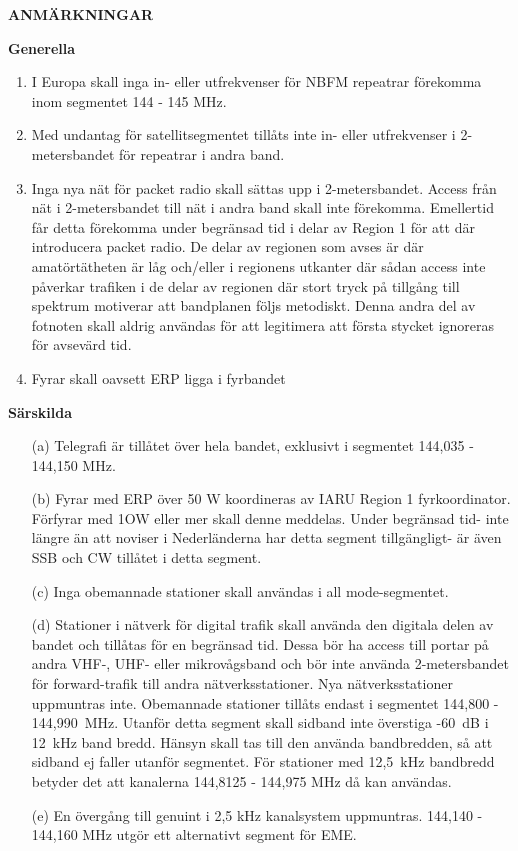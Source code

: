 \textbf{ANMÄRKNINGAR}

\textbf{Generella}
\begin{enumerate}[label=\alph*.]
\item I Europa skall inga in- eller utfrekvenser för NBFM repeatrar
  förekomma inom segmentet 144 - 145 MHz.
\item Med undantag för satellitsegmentet tillåts inte in- eller
  utfrekvenser i 2-metersbandet för repeatrar i andra band.
\item Inga nya nät för packet radio skall sättas upp i 2-metersbandet.
  Access från nät i 2-metersbandet till nät i andra band skall inte förekomma.
  Emellertid får detta förekomma under begränsad tid i delar av Region 1
  för att där introducera packet radio.
  De delar av regionen som avses är där amatörtätheten är låg och/eller
  i regionens utkanter där sådan access inte påverkar trafiken i de delar
  av regionen där stort tryck på tillgång till spektrum motiverar att
  bandplanen följs metodiskt.
  Denna andra del av fotnoten skall aldrig användas för att legitimera
  att första stycket ignoreras för avsevärd tid.
\item Fyrar skall oavsett ERP ligga i fyrbandet
\end{enumerate}

\textbf{Särskilda}
\begin{itemize}

\item[(a)] Telegrafi är tillåtet över hela bandet, exklusivt i segmentet
  144,035 - 144,150 MHz.

\item[(b)] Fyrar med ERP över 50 W koordineras av IARU Region 1 fyrkoordinator.
  Förfyrar med 1OW eller mer skall denne meddelas. Under begränsad tid- inte
  längre än att noviser i Nederländerna har detta segment tillgängligt- är
  även SSB och CW tillåtet i detta segment.

\item[(c)] Inga obemannade stationer skall användas i all mode-segmentet.

\item[(d)] Stationer i nätverk för digital trafik skall använda den
digitala delen av bandet och tillåtas för en begränsad tid.
Dessa bör ha access till portar på andra VHF-, UHF- eller mikrovågsband och bör
inte använda 2-metersbandet för forward-trafik till andra nätverksstationer.
Nya nätverksstationer uppmuntras inte.
Obemannade stationer tillåts endast i segmentet 144,800 - 144,990~MHz.
Utanför detta segment skall sidband inte överstiga -60~dB i 12~kHz band bredd.
Hänsyn skall tas till den använda bandbredden, så att sidband ej faller
utanför segmentet.
För stationer med 12,5~kHz bandbredd betyder det att kanalerna
144,8125 - 144,975 MHz då kan användas.

\item[(e)] En övergång till genuint i 2,5 kHz kanalsystem uppmuntras.
144,140 - 144,160 MHz utgör ett alternativt segment för EME.
\end{itemize}

